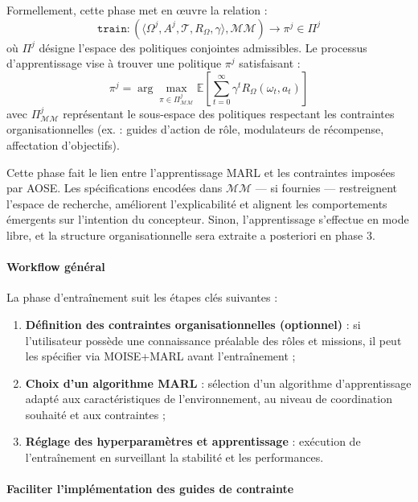 Formellement, cette phase met en œuvre la relation :
\[
    \texttt{train}: \left( \langle \Omega^j, A^j, \mathcal{T}, R_{\Omega}, \gamma \rangle, \mathcal{MM} \right) \longrightarrow \pi^j \in \Pi^j
\]
où $\Pi^j$ désigne l'espace des politiques conjointes admissibles. Le processus d'apprentissage vise à trouver une politique $\pi^j$ satisfaisant :
\[
    \pi^j = \arg\max_{\pi \in \Pi^j_{\mathcal{MM}}} \mathbb{E} \left[ \sum_{t=0}^{\infty} \gamma^t R_{\Omega}(\omega_t, a_t) \right]
\]
avec $\Pi^j_{\mathcal{MM}}$ représentant le sous-espace des politiques respectant les contraintes organisationnelles (ex. : guides d'action de rôle, modulateurs de récompense, affectation d'objectifs).

Cette phase fait le lien entre l'apprentissage MARL et les contraintes imposées par AOSE. Les spécifications encodées dans $\mathcal{MM}$ — si fournies — restreignent l'espace de recherche, améliorent l'explicabilité et alignent les comportements émergents sur l'intention du concepteur. Sinon, l'apprentissage s'effectue en mode libre, et la structure organisationnelle sera extraite a posteriori en phase 3.

\paragraph{Workflow général}

La phase d'entraînement suit les étapes clés suivantes :
\begin{enumerate}
    \item \textbf{Définition des contraintes organisationnelles (optionnel)} : si l'utilisateur possède une connaissance préalable des rôles et missions, il peut les spécifier via MOISE+MARL avant l'entraînement ;
          
    \item \textbf{Choix d'un algorithme MARL} : sélection d'un algorithme d'apprentissage adapté aux caractéristiques de l'environnement, au niveau de coordination souhaité et aux contraintes ;
          
    \item \textbf{Réglage des hyperparamètres et apprentissage} : exécution de l'entraînement en surveillant la stabilité et les performances.
\end{enumerate}

\paragraph{Faciliter l'implémentation des guides de contrainte}

